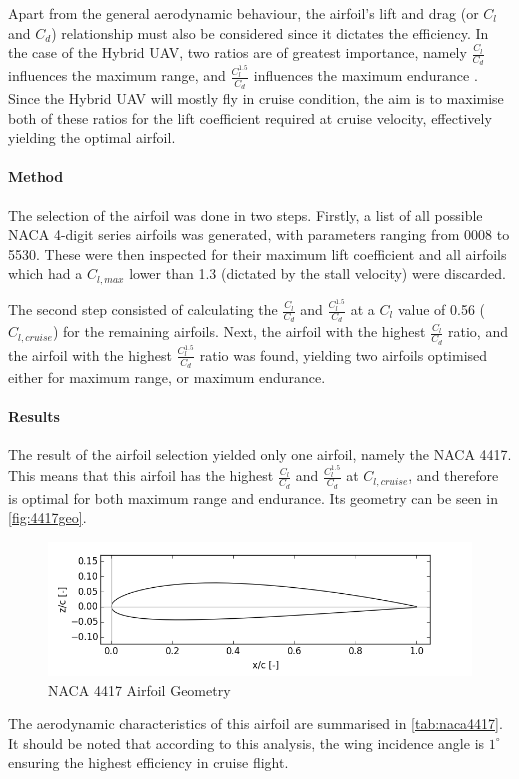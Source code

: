 Apart from the general aerodynamic behaviour, the airfoil's lift and drag (or $C_{l}$ and $C_{d}$) relationship must also be considered since it dictates the efficiency. In the case of the Hybrid UAV, two ratios are of greatest importance, namely $\frac{C_{l}}{C_{d}}$ influences the maximum range, and $\frac{C_{l}^{1.5}}{C_{d}}$ influences the maximum endurance \cite{perf}. Since the Hybrid UAV will mostly fly in cruise condition, the aim is to maximise both of these ratios for the lift coefficient required at cruise velocity, effectively yielding the optimal airfoil.

\paragraph{Method} The selection of the airfoil was done in two steps. Firstly, a list of all possible NACA 4-digit series airfoils was generated, with parameters ranging from 0008 to 5530. These were then inspected for their maximum lift coefficient and all airfoils which had a $C_{l,max}$ lower than 1.3 (dictated by the stall velocity) were discarded. 

The second step consisted of calculating the $\frac{C_{l}}{C_{d}}$ and $\frac{C_{l}^{1.5}}{C_{d}}$ at a $C_{l}$ value of 0.56 ($C_{l,cruise}$) for the remaining airfoils. Next, the airfoil with the highest $\frac{C_{l}}{C_{d}}$ ratio, and the airfoil with the highest $\frac{C_{l}^{1.5}}{C_{d}}$ ratio was found, yielding two airfoils optimised either for maximum range, or maximum endurance.

\paragraph{Results} The result of the airfoil selection yielded only one airfoil, namely the NACA 4417. This means that this airfoil has the highest $\frac{C_{l}}{C_{d}}$ and $\frac{C_{l}^{1.5}}{C_{d}}$ at $C_{l,cruise}$, and therefore is optimal for both maximum range and endurance. Its geometry can be seen in \autoref{fig:4417geo}.

\begin{figure}[H]
    \centering
    \includegraphics[scale=0.75]{Aerodynamics/Figures/4417geo}
    \caption{NACA 4417 Airfoil Geometry}
    \label{fig:4417geo}
\end{figure}
The aerodynamic characteristics of this airfoil are summarised in \autoref{tab:naca4417}. It should be noted that according to this analysis, the wing incidence angle is $1^{\circ}$ ensuring the highest efficiency in cruise flight.


